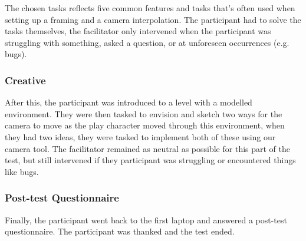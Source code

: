 The chosen tasks reflects five common features and tasks that's often used when setting up a framing and a camera interpolation. The participant had to solve the tasks themselves, the facilitator only intervened when the participant was struggling with something, asked a question, or at unforeseen occurrences (e.g. bugs). 

\subsubsection{Creative}
After this, the participant was introduced to a level with a modelled environment. They were then tasked to envision and sketch two ways for the camera to move as the play character moved through this environment, when they had two ideas, they were tasked to implement both of these using our camera tool. The facilitator remained as neutral as possible for this part of the test, but still intervened if they participant was struggling or encountered things like bugs.

\subsubsection{Post-test Questionnaire}
Finally, the participant went back to the first laptop and answered a post-test questionnaire. The participant was thanked and the test ended.